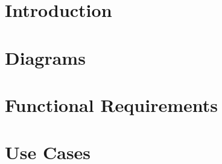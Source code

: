 \documentclass[11pt,a5paper,footinclude=true,headinclude=true]{report} %
\begin{document}
  




	\tableofcontents 
	\part{Introduction}


  
  
\part{Diagrams}    



\part{Functional Requirements}







\part{Use Cases}


\end{document}
